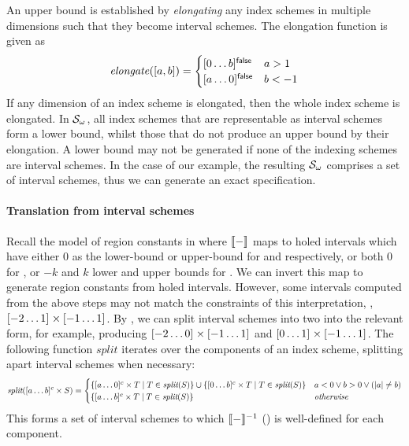 An upper bound is established by
\emph{elongating} any index schemes in multiple dimensions such that
they become interval schemes. The elongation function is
given as
%
\begin{align*}
  \mathit{elongate}([a,b]) = \begin{cases}
    \textnormal{$\lbrack0\dots b\rbrack^{\textsf{false}}$} & a > 1 \\
    \textnormal{$\lbrack a\dots0\rbrack^{\textsf{false}}$} & b < -1
  \end{cases}
\end{align*}
%
If any dimension of an index scheme is elongated, then the whole index
scheme is elongated. In $\mathcal{S}_\omega$, all index schemes that are
representable as interval schemes form a lower bound, whilst those
that do not produce an upper bound by their elongation. A lower bound
may not be generated if none of the indexing schemes are interval schemes.
In the case of our example, the resulting $\mathcal{S}_\omega$ comprises a set
of interval schemes, thus we can generate an exact specification.

\paragraph{Translation from interval schemes}

Recall the model of region constants in 
where $\llbracket{} {-} \rrbracket{}$ maps to holed intervals which have either $0$ as
the lower-bound or upper-bound for  and
 respectively, or both $0$ for , or
$-k$ and $k$ lower and upper bounds for . We can
invert this map to generate region constants from holed
intervals. However, some intervals computed from the above steps
may not match the constraints of this interpretation,
\eg{}, $\textnormal{$\lbrack-2\dots1\rbrack^{}$} \times \textnormal{$\lbrack-1\dots1\rbrack^{}$}$.  By
, we can split interval schemes into two into
the relevant form, for example, producing
$\textnormal{$\lbrack-2\dots0\rbrack^{}$} \times \textnormal{$\lbrack-1\dots1\rbrack^{}$}$ and
$\textnormal{$\lbrack0\dots1\rbrack^{}$} \times \textnormal{$\lbrack-1\dots1\rbrack^{}$}$. 
The following function
$\textit{split}$ iterates over the components of an index scheme,
splitting apart interval schemes when necessary:
%
\begin{align*}
  \textit{split}(\textnormal{$\lbrack a\dots b\rbrack^{c}$} \times S) =
   \begin{cases}
  \{ \textnormal{$\lbrack a\dots0\rbrack^{c}$} \times T \mid T \in \textit{split}(S) \}
  \cup
  \{ \textnormal{$\lbrack0\dots b\rbrack^{c}$} \times T \mid T \in \textit{split}(S) \}
  & a < 0 \vee b > 0 \vee (|a| \neq b) \\
  \{ \textnormal{$\lbrack a\dots b\rbrack^{c}$} \times T \mid T \in \textit{split}(S) \}
  & \textit{otherwise}
\end{cases}
\end{align*}
%
This forms a set of interval schemes to which $\llbracket{} {-} \rrbracket{}^{-1}$
() is well-defined for each component.

